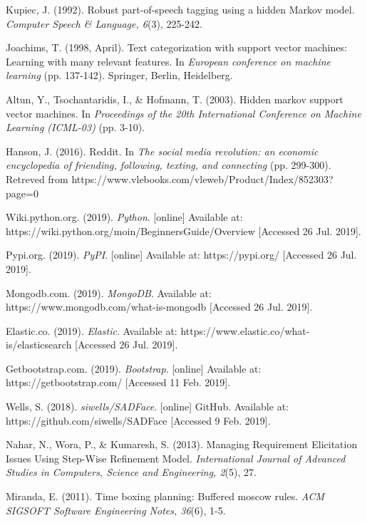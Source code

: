 \documentclass[12pt,a4paper]{article}
\begin{document}
\begin{thebibliography}{9}
  Kupiec, J. (1992). Robust part-of-speech tagging using a hidden Markov model. \textit{Computer Speech \& Language, 6}(3), 225-242.

  Joachims, T. (1998, April). Text categorization with support vector machines: Learning with many relevant features. In \textit{European conference on machine learning} (pp. 137-142). Springer, Berlin, Heidelberg.
  
  Altun, Y., Tsochantaridis, I., \& Hofmann, T. (2003). Hidden markov support vector machines. In \textit{Proceedings of the 20th International Conference on Machine Learning (ICML-03)} (pp. 3-10).
  
  Hanson, J. (2016). Reddit. In \textit{The social media revolution: an economic encyclopedia of friending, following, texting, and connecting} (pp. 299-300). Retreved from https://www.vlebooks.com/vleweb/Product/Index/852303?page=0
  
  Wiki.python.org. (2019). \textit{Python}. [online] Available at: https://wiki.python.org/moin/BeginnersGuide/Overview [Accessed 26 Jul. 2019].
  
  Pypi.org. (2019). \textit{PyPI}. [online] Available at: https://pypi.org/ [Accessed 26 Jul. 2019].
  
  Mongodb.com. (2019). \textit{MongoDB}. Available at: https://www.mongodb.com/what-is-mongodb [Accessed 26 Jul. 2019].
  
  Elastic.co. (2019). \textit{Elastic}. Available at: https://www.elastic.co/what-is/elasticsearch [Accessed 26 Jul. 2019].
 
  Getbootstrap.com. (2019). \textit{Bootstrap}. [online] Available at: https://getbootstrap.com/ [Accessed 11 Feb. 2019].

  Wells, S. (2018). \textit{siwells/SADFace}. [online] GitHub. Available at: https://github.com/siwells/SADFace [Accessed 9 Feb. 2019].
 
  Nahar, N., Wora, P., \& Kumaresh, S. (2013). Managing Requirement Elicitation Issues Using Step-Wise Refinement Model. \textit{International Journal of Advanced Studies in Computers, Science and Engineering, 2}(5), 27.

  Miranda, E. (2011). Time boxing planning: Buffered moscow rules. \textit{ACM SIGSOFT Software Engineering Notes, 36}(6), 1-5.
  

\end{thebibliography}
\end{document}
